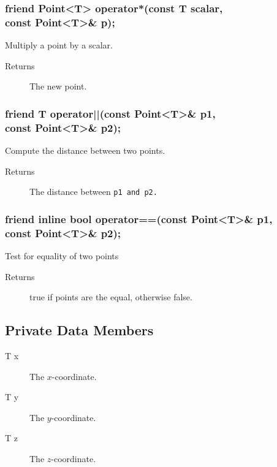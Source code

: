 \subsubsection{friend Point<T> operator*(const T scalar, \\ 
                                         const Point<T>\& p);}
Multiply a point by a scalar.
\begin{description}
  \item[Returns] The new point.
\end{description}

\subsubsection{friend T operator||(const Point<T>\& p1, \\ 
                                   const Point<T>\& p2);}
Compute the distance between two points.
\begin{description}
  \item[Returns] The distance between \tt p1 \rm and \tt p2\rm.
\end{description}

\subsubsection{friend inline bool operator==(const Point<T>\& p1, \\
                                             const Point<T>\& p2);}
Test for equality of two points
\begin{description}
  \item[Returns] true if points are the equal, otherwise false.
\end{description}

\subsection{Private Data Members}
\begin{description} 
  \item [T x] The $x$-coordinate.
  \item [T y] The $y$-coordinate.
  \item [T z] The $z$-coordinate.
\end{description}



